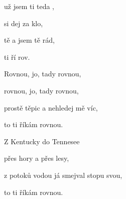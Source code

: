

\zs
{} už jsem ti teda ,

 si dej za klo,

 tě  a  jsem tě rád,

 ti ří rov.
\ks

\zr
Rovnou, jo, tady rovnou,

rovnou, jo, tady rovnou,

prostě těpic a nehledej mě víc,

to ti říkám rovnou.
\kr

\zs
Z Kentucky do Tennesee

přes hory a přes lesy,

z potoků vodou já smejval stopu svou,

to ti říkám rovnou.
\ks

\zr
\kr

\kp







